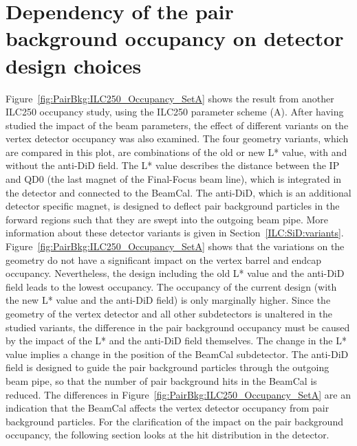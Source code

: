 \section{Dependency of the pair background occupancy on detector design choices}
\label{PairBkg:SiD_design}
Figure~\ref{fig:PairBkg:ILC250_Occupancy_SetA} shows the result from another ILC250 occupancy study, using the ILC250 parameter scheme (A).
After having studied the impact of the beam parameters, the effect of different \sid variants on the vertex detector occupancy was also examined.
The four geometry variants, which are compared in this plot, are combinations of the old or new L* value, with and without the \sid anti-DiD field.
The L* value describes the distance between the IP and QD0 (the last magnet of the Final-Focus beam line), which is integrated in the detector and connected to the BeamCal.
The anti-DiD, which is an additional detector specific magnet, is designed to deflect pair background particles in the forward regions such that they are swept into the outgoing beam pipe.
More information about these detector variants is given in Section~\ref{ILC:SiD:variants}.
\\Figure~\ref{fig:PairBkg:ILC250_Occupancy_SetA} shows that the variations on the \sid geometry do not have a significant impact on the vertex barrel and endcap occupancy. 
Nevertheless, the \sid design including the old L* value and the anti-DiD field leads to the lowest occupancy.
The occupancy of the current design (with the new L* value and the anti-DiD field) is only marginally higher.
Since the geometry of the vertex detector and all other subdetectors is unaltered in the studied \sid variants, the difference in the pair background occupancy must be caused by the impact of the L* and the anti-DiD field themselves.
The change in the L* value implies a change in the position of the BeamCal subdetector.
The anti-DiD field is designed to guide the pair background particles through the outgoing beam pipe, so that the number of pair background hits in the BeamCal is reduced.
The differences in Figure~\ref{fig:PairBkg:ILC250_Occupancy_SetA} are an indication that the \sid BeamCal affects the vertex detector occupancy from pair background particles.
For the clarification of the impact on the pair background occupancy, the following section looks at the hit distribution in the \sid detector.
